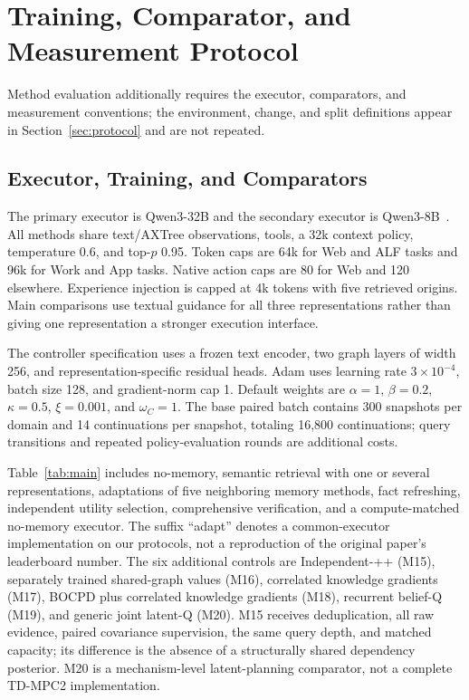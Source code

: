 \documentclass[sigconf,anonymous,review]{acmart}
\theoremstyle{zhplain}
\begin{document}
\section{Training, Comparator, and Measurement Protocol}
\label{sec:evalproto}
Method evaluation additionally requires the executor, comparators, and measurement conventions; the environment, change, and split definitions appear in Section~\ref{sec:protocol} and are not repeated.

\subsection{Executor, Training, and Comparators}
The primary executor is Qwen3-32B and the secondary executor is Qwen3-8B~\cite{qwen32,qwen8}. All methods share text/AXTree observations, tools, a 32k context policy, temperature 0.6, and top-\(p\) 0.95. Token caps are 64k for Web and ALF tasks and 96k for Work and App tasks. Native action caps are 80 for Web and 120 elsewhere. Experience injection is capped at 4k tokens with five retrieved origins. Main comparisons use textual guidance for all three representations rather than giving one representation a stronger execution interface.

The controller specification uses a frozen text encoder, two graph layers of width 256, and representation-specific residual heads. Adam uses learning rate \(3\times10^{-4}\), batch size 128, and gradient-norm cap 1. Default weights are \(\alpha=1\), \(\beta=0.2\), \(\kappa=0.5\), \(\xi=0.001\), and \(\omega_C=1\). The base paired batch contains 300 snapshots per domain and 14 continuations per snapshot, totaling 16,800 continuations; query transitions and repeated policy-evaluation rounds are additional costs.

Table~\ref{tab:main} includes no-memory, semantic retrieval with one or several representations, adaptations of five neighboring memory methods, fact refreshing, independent utility selection, comprehensive verification, and a compute-matched no-memory executor. The suffix ``adapt'' denotes a common-executor implementation on our protocols, not a reproduction of the original paper's leaderboard number. The six additional controls are Independent-++ (M15), separately trained shared-graph values (M16), correlated knowledge gradients (M17), BOCPD plus correlated knowledge gradients (M18), recurrent belief-Q (M19), and generic joint latent-Q (M20). M15 receives deduplication, all raw evidence, paired covariance supervision, the same query depth, and matched capacity; its difference is the absence of a structurally shared dependency posterior. M20 is a mechanism-level latent-planning comparator, not a complete TD-MPC2 implementation.
\end{document}
